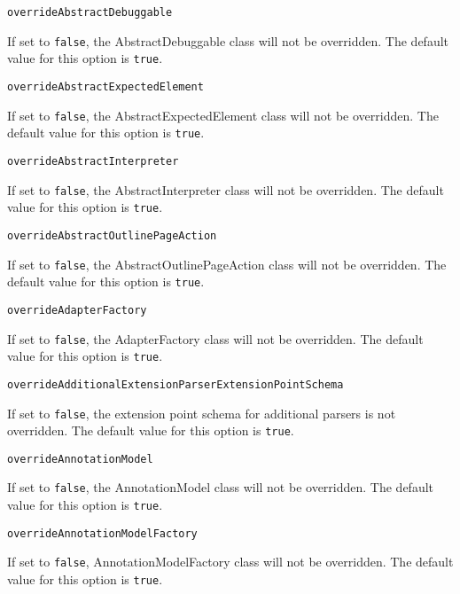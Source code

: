 \noindent\texttt{overrideAbstractDebuggable}
\begin{myindentpar}{1cm}
If set to \texttt{false}, the AbstractDebuggable class will not be overridden. The default value for this option is \texttt{true}.
\end{myindentpar}

\noindent\texttt{overrideAbstractExpectedElement}
\begin{myindentpar}{1cm}
If set to \texttt{false}, the AbstractExpectedElement class will not be overridden. The default value for this option is \texttt{true}.
\end{myindentpar}

\noindent\texttt{overrideAbstractInterpreter}
\begin{myindentpar}{1cm}
If set to \texttt{false}, the AbstractInterpreter class will not be overridden. The default value for this option is \texttt{true}.
\end{myindentpar}

\noindent\texttt{overrideAbstractOutlinePageAction}
\begin{myindentpar}{1cm}
If set to \texttt{false}, the AbstractOutlinePageAction class will not be overridden. The default value for this option is \texttt{true}.
\end{myindentpar}

\noindent\texttt{overrideAdapterFactory}
\begin{myindentpar}{1cm}
If set to \texttt{false}, the AdapterFactory class will not be overridden. The default value for this option is \texttt{true}.
\end{myindentpar}

\noindent\texttt{overrideAdditionalExtensionParserExtensionPointSchema}
\begin{myindentpar}{1cm}
If set to \texttt{false}, the extension point schema for additional parsers is not overridden. The default value for this option is \texttt{true}.
\end{myindentpar}

\noindent\texttt{overrideAnnotationModel}
\begin{myindentpar}{1cm}
If set to \texttt{false}, the AnnotationModel class will not be overridden. The default value for this option is \texttt{true}.
\end{myindentpar}

\noindent\texttt{overrideAnnotationModelFactory}
\begin{myindentpar}{1cm}
If set to \texttt{false}, AnnotationModelFactory class will not be overridden. The default value for this option is \texttt{true}.
\end{myindentpar}


